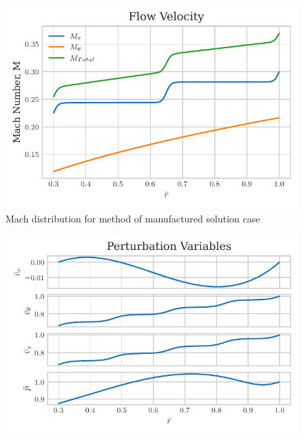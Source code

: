 \documentclass{article}
\begin{document}
%
%
\begin{figure}
    \centering
    \includegraphics{tex-outputs/MachDistribution.pdf}
    \caption{Mach distribution for method of manufactured solution case}
\end{figure}

 \begin{figure}
     \centering
     \includegraphics{tex-outputs/PerturbationVariables.pdf}
 \end{figure}
\end{document}
